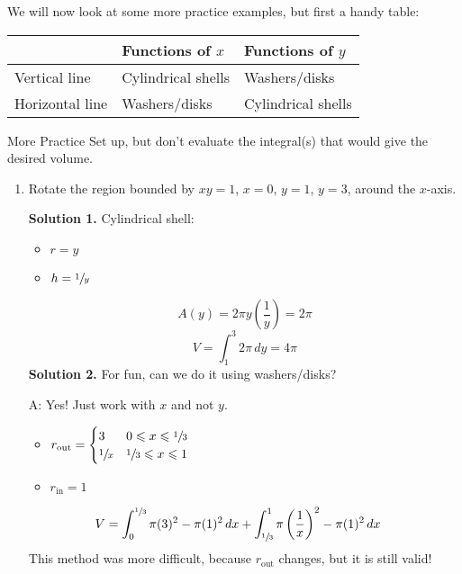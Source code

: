 We will now look at some more practice examples, but first a handy table:

\begin{table}[H]
    \centering
    \begin{tabularx}{0.7\linewidth}{@{}YYY@{}}
                        & Functions of $ x $ & Functions of $ y $ \\
        \midrule
        Vertical line   & Cylindrical shells & Washers/disks      \\
        Horizontal line & Washers/disks      & Cylindrical shells
    \end{tabularx}
\end{table}

\begin{Example}{More Practice}{}
    Set up, but don't evaluate the integral(s) that would give
    the desired volume.

    \begin{enumerate}[label=(\roman*)]
        \item Rotate the region bounded by $ xy=1 $, $ x=0 $, $ y=1 $, $ y=3 $,
              around the $ x $-axis.

              \textbf{Solution 1.} Cylindrical shell:
              \begin{itemize}
                  \item $ r=y $
                  \item $ h=\sfrac{1}{y} $
              \end{itemize}
              \[ A(y)=2\pi y\left( \frac{1}{y}  \right)=2\pi \]
              \[ V=\int_{1}^{3} 2\pi\, d{y}=4\pi \]
              \textbf{Solution 2.} For fun, can we do it using washers/disks?

              A\@: Yes! Just work with $ x $ and not $ y $.
              \begin{itemize}
                  \item $ \displaystyle  r_{\text{out}}=\begin{cases}
                                3            & 0\leqslant x\leqslant \sfrac{1}{3}   \\
                                \sfrac{1}{x} & \sfrac{1}{3} \leqslant x \leqslant 1
                            \end{cases} $
                  \item $ r_{\text{in}}=1 $
              \end{itemize}
              \begin{align*}
                  V
                   & =\int_{0}^{\sfrac{1}{3}} \pi(3)^2-\pi(1)^2\, d{x}
                  +\int_{\sfrac{1}{3}}^{1} \pi\left( \frac{1}{x} \right)^2-\pi(1)^2\, d{x}
              \end{align*}
              This method was more difficult, because $ r_{\text{out}} $ changes, but it is still valid!


\end{enumerate}
\end{Example}
